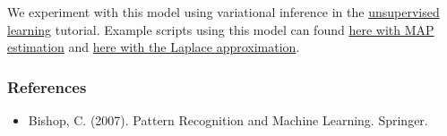 We experiment with this model using variational inference in the
\href{tut_unsupervised.html}{unsupervised learning} tutorial.
Example scripts using this model can found
\href{https://github.com/blei-lab/edward/blob/master/examples/mixture_gaussian_map.py}
{here with MAP estimation} and
\href{https://github.com/blei-lab/edward/blob/master/examples/mixture_gaussian_laplace.py}
{here with the Laplace approximation}.

\subsubsection{References}\label{references}

\begin{itemize}
\item
  Bishop, C. (2007). Pattern Recognition and Machine Learning. Springer.
\end{itemize}

